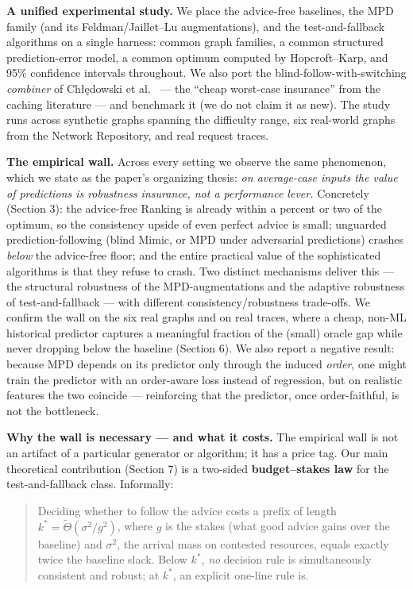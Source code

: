\textbf{A unified experimental study.} We place the advice-free
baselines, the MPD family (and its Feldman/Jaillet--Lu augmentations),
and the test-and-fallback algorithms on a single harness: common graph
families, a common structured prediction-error model, a common optimum
computed by Hopcroft--Karp, and 95\% confidence intervals throughout. We
also port the blind-follow-with-switching \emph{combiner} of Chłędowski
et al.~\cite{chledowski2021caching} --- the ``cheap worst-case
insurance'' from the caching literature --- and benchmark it (we do not
claim it as new). The study runs across synthetic graphs spanning the
difficulty range, six real-world graphs from the Network Repository, and
real request traces.

\textbf{The empirical wall.} Across every setting we observe the same
phenomenon, which we state as the paper's organizing thesis: \emph{on
average-case inputs the value of predictions is robustness insurance,
not a performance lever.} Concretely (Section 3): the advice-free
Ranking is already within a percent or two of the optimum, so the
consistency upside of even perfect advice is small; unguarded
prediction-following (blind Mimic, or MPD under adversarial predictions)
crashes \emph{below} the advice-free floor; and the entire practical
value of the sophisticated algorithms is that they refuse to crash. Two
distinct mechanisms deliver this --- the structural robustness of the
MPD-augmentations and the adaptive robustness of test-and-fallback ---
with different consistency/robustness trade-offs. We confirm the wall on
the six real graphs and on real traces, where a cheap, non-ML historical
predictor captures a meaningful fraction of the (small) oracle gap while
never dropping below the baseline (Section 6). We also report a negative
result: because MPD depends on its predictor only through the induced
\emph{order}, one might train the predictor with an order-aware loss
instead of regression, but on realistic features the two coincide ---
reinforcing that the predictor, once order-faithful, is not the
bottleneck.

\textbf{Why the wall is necessary --- and what it costs.} The empirical
wall is not an artifact of a particular generator or algorithm; it has a
price tag. Our main theoretical contribution (Section 7) is a two-sided
\textbf{budget--stakes law} for the test-and-fallback class. Informally:

\begin{quote}
Deciding whether to follow the advice costs a prefix of length
\(k^* = \tilde\Theta(\sigma^2/g^2)\), where \(g\) is the stakes (what
good advice gains over the baseline) and \(\sigma^2\), the arrival mass
on contested resources, equals exactly twice the baseline slack. Below
\(k^*\), \emph{no} decision rule is simultaneously consistent and
robust; at \(k^*\), an explicit one-line rule is.
\end{quote}

